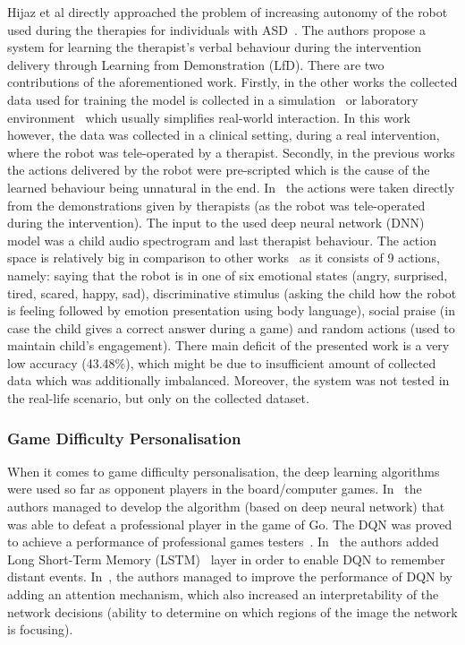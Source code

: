 \documentclass[thesis]{mas_proposal}
\begin{document}
Hijaz et al directly approached the problem of increasing autonomy of the robot used during the therapies for individuals with ASD~\cite{Hijaz2021}. The authors propose a system for learning the therapist's verbal behaviour during the intervention delivery through Learning from Demonstration (LfD). There are two contributions of the aforementioned work. Firstly, in the other works the collected data used for training the model is collected in a simulation~\cite{Turner2018,Belo2021,Belo2022} or laboratory environment~\cite{ClarkTurner2017,Turner2018,Romeo2018} which usually simplifies real-world interaction. In this work however, the data was collected in a clinical setting, during a real intervention, where the robot was tele-operated by a therapist. Secondly, in the previous works the actions delivered by the robot were pre-scripted which is the cause of the learned behaviour being unnatural in the end. In~\cite{Hijaz2021} the actions were taken directly from the demonstrations given by therapists (as the robot was tele-operated during the intervention). The input to the used deep neural network (DNN) model was a child audio spectrogram and last therapist behaviour. The action space is relatively big in comparison to other works~\cite{Qureshi2016,Qureshi2017,Qureshi2018,ClarkTurner2017,Turner2018,Belo2021,Belo2022,Romeo2018,Romeo2019} as it consists of 9 actions, namely: saying that the robot is in one of six emotional states (angry, surprised, tired, scared, happy, sad), discriminative stimulus (asking the child how the robot is feeling followed by emotion presentation using body language), social praise (in case the child gives a correct answer during a game) and random actions (used to maintain child's engagement). There main deficit of the presented work is a very low accuracy (43.48\%), which might be due to insufficient amount of collected data which was additionally imbalanced. Moreover, the system was not tested in the real-life scenario, but only on the collected dataset. 


\subsubsection{Game Difficulty Personalisation}
When it comes to game difficulty personalisation, the deep learning algorithms were used so far as opponent players in the board/computer games. In~\cite{Silver2016} the authors managed to develop the algorithm (based on deep neural network) that was able to defeat a professional player in the game of Go. The DQN was proved to achieve a performance of professional games testers~\cite{mnih2015human}. In~\cite{hausknecht2015deep} the authors added Long Short-Term Memory (LSTM)~\cite{hochreiter1997long} layer in order to enable DQN to remember distant events. In~\cite{sorokin2015deep}, the authors managed to improve the performance of DQN by adding an attention mechanism, which also increased an interpretability of the network decisions (ability to determine on which regions of the image the network is focusing). 
\end{document}
